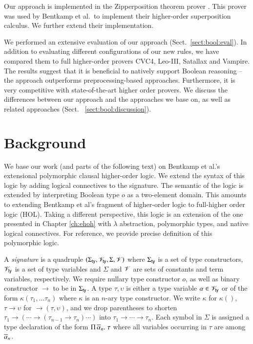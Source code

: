 Our approach is implemented in the Zipperposition theorem prover
\cite{sc-15-simon-phd,sc-supind-17}. This prover was used by Bentkamp et al.\
to implement their higher-order superposition calculus. We further extend
their implementation.

We performed an extensive evaluation of our approach (Sect.~\ref{sect:bool:eval}).
In addition to evaluating different configurations of our new rules, we have
compared them to full higher-order provers CVC4, Leo-III,  Satallax and Vampire.
The results suggest that it is beneficial to natively support Boolean reasoning
-- the approach outperforms preprocessing-based approaches. Furthermore, it is
very competitive with state-of-the-art higher order provers. We discuss the differences between our approach and the
approaches we base on, as well as related approaches (Sect.~
\ref{sect:bool:discussion}).


\section{Background} 
\label{sect:bool:background}

We base our work (and parts of the following text) on Bentkamp et al.'s \cite{bbtvw-21-sup-lam} extensional
polymorphic clausal higher-order logic. We extend the syntax of this logic by
adding logical connectives to the signature. The semantic of the logic
is extended by interpreting Boolean type $o$ as a two-element domain. This
amounts to extending Bentkamp et al's fragment of higher-order logic to
full-higher order logic (HOL). Taking a different perspective, this logic is an extension of the one
presented in Chapter \ref{ch:ehoh} with $\lambda$ abstraction, polymorphic
types, and native logical connectives. For reference, we provide precise definition of this polymorphic logic.

A {\em signature} is a quadruple $(\Sigma_\mathsf{ty}, \mathscr{V}_\mathsf{ty}, \Sigma, \mathscr{V})$ where $\Sigma_\mathsf{ty}$ is a
set of type constructors, $\mathscr{V}_\mathsf{ty}$ is a set of type variables and $\Sigma$ and
$\mathscr{V}$ are sets of constants and term variables, respectively. We require nullary
type constructor $o$, as well as binary constructor $\rightarrow$
to be in $\Sigma_\mathsf{ty}$. A type $\tau, \upsilon$ is either a type variable $\alpha \in
\mathscr{V}_\mathsf{ty}$ or of the form $\kappa(\tau_1, \ldots \tau_n)$ where $\kappa$ is an
$n$-ary type constructor. We write $\kappa$ for $\kappa()$, $\tau \rightarrow
\upsilon$ for $\rightarrow(\tau, \upsilon)$, and we drop parentheses to shorten 
$\tau_1 \rightarrow (\cdots \rightarrow (\tau_{n-1} \rightarrow \tau_n) \cdots)$ into $\tau_1 \rightarrow \cdots \rightarrow
\tau_n$. Each symbol in $\Sigma$ is
assigned a type declaration of the form $\Pi\,\overline{\alpha}_{n}.\; \tau$ where all variables
occurring in $\tau$ are among $\overline{\alpha}_{n}$.


